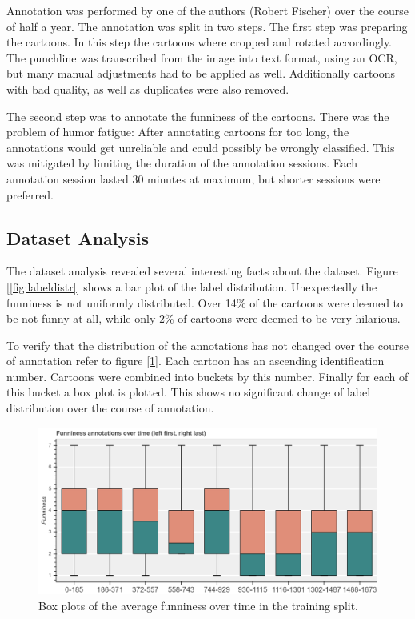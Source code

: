 \documentclass[draft,final,oneside]{vutinfth} %
\begin{document}
Annotation was performed by one of the authors (Robert Fischer) over the course of half a year. The annotation was split in two steps. The first step was preparing the cartoons. In this step the cartoons where cropped and rotated accordingly. The punchline was transcribed from the image into text format, using an OCR, but many manual adjustments had to be applied as well. Additionally cartoons with bad quality, as well as duplicates were also removed.

The second step was to annotate the funniness of the cartoons. There was the problem of humor fatigue: After annotating cartoons for too long, the annotations would get unreliable and could possibly be wrongly classified. This was mitigated by limiting the duration of the annotation sessions. Each annotation session lasted 30 minutes at maximum, but shorter sessions were preferred. 

\subsection{Dataset Analysis}

The dataset analysis revealed several interesting facts about the dataset. Figure [\ref{fig:labeldistr}] shows a bar plot of the label distribution. Unexpectedly the funniness is not uniformly distributed. Over 14\% of the cartoons were deemed to be not funny at all, while only 2\% of cartoons were deemed to be very hilarious.

To verify that the distribution of the annotations has not changed over the course of annotation refer to figure [\ref{fig:boxplottime}]. Each cartoon has an ascending identification number. Cartoons were  combined into buckets by this number. Finally for each of this bucket a box plot is plotted. This shows no significant change of label distribution over the course of annotation.

\begin{figure}
	\centering
  	\includegraphics[width=1.0\textwidth]{graphics/average_funniness_over_time}
	\caption{Box plots of the average funniness over time in the training split.}
	\label{fig:boxplottime}
\end{figure}
\end{document}
